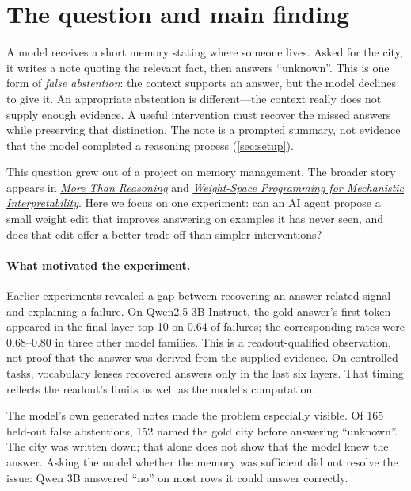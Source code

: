 \section{The question and main finding}
\label{sec:question}

A model receives a short memory stating where someone lives. Asked for the city, it writes a note quoting the
relevant fact, then answers ``unknown''. This is one form of \emph{false abstention}: the context supports an
answer, but the model declines to give it. An appropriate abstention is different---the context really does not
supply enough evidence. A useful intervention must recover the missed answers while preserving that distinction.
The note is a prompted summary, not evidence that the model completed a reasoning process
(\cref{sec:setup}).

This question grew out of a project on memory management. The broader story appears in
\href{https://qamil-mirza.com/research/more-than-reasoning}{\emph{More Than Reasoning}} and
\href{https://qamil-mirza.com/research/ai-brain-surgery}{\emph{Weight-Space Programming for Mechanistic Interpretability}}.
Here we focus on one experiment: can an AI agent propose a small weight edit that improves answering on examples
it has never seen, and does that edit offer a better trade-off than simpler interventions?

\paragraph{What motivated the experiment.}
Earlier experiments revealed a gap between recovering an answer-related signal and explaining a failure.
On Qwen2.5-3B-Instruct, the gold answer's first token appeared in the final-layer top-10 on 0.64 of failures;
the corresponding rates were 0.68--0.80 in three other model families. This is a readout-qualified observation,
not proof that the answer was derived from the supplied evidence. On controlled tasks, vocabulary lenses
recovered answers only in the last six layers. That timing reflects the readout's limits as well as the
model's computation.

The model's own generated notes made the problem especially visible. Of 165 held-out false abstentions,
152 named the gold city before answering ``unknown''. The city was written down; that alone does not show
that the model knew the answer. Asking the model whether the memory was sufficient did not resolve the issue:
Qwen 3B answered ``no'' on most rows it could answer correctly.

